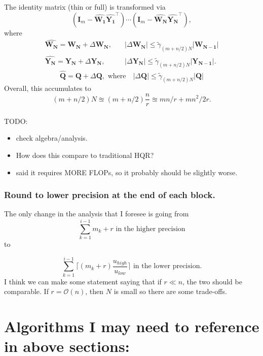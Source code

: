 \documentclass[review,onefignum,onetabnum]{siamart190516}
\newcommand{\bb}[1]{\mathbf{#1}}
\newcommand{\cO}{\mathcal{O}}
\begin{document}
The identity matrix (thin or full) is transformed via 
$$(\bb{I}_m-\hat{\bb{W_{1}}}\hat{{\bb{Y_{1}}}}^{\top})\cdots (\bb{I}_m-\hat{\bb{W_N}}\hat{{\bb{Y_N}}}^{\top}),$$
where
\begin{align*}
\hat{\bb{W_{N}}} = \bb{W_{N}}+\Delta\bb{W_{N}},\quad &  |\Delta\bb{W_{N}}| \leq \tilde{\gamma}_{(m+n/2)N}|\bb{W_{N-1}}|  \\
\hat{\bb{Y_{N}}} = \bb{Y_{N}}+\Delta\bb{Y_{N}},\quad &  |\Delta\bb{Y_{N}}| \leq \tilde{\gamma}_{(m+n/2)N}|\bb{Y_{N-1}}|.
\end{align*}
\[\boxed{ \hat{\bb{Q}} = \bb{Q}+\Delta\bb{Q},\text{ where}\quad |\Delta\bb{Q}| \leq \tilde{\gamma}_{(m+n/2)N}|\bb{Q}|} 
\]
Overall, this accumulates to $$(m+n/2)N \approxeq (m+n/2)\frac{n}{r} \approxeq mn/r + mn^2/2r.$$\\

TODO: 
\begin{itemize}
	\item check algebra/analysis.
	\item How does this compare to traditional HQR?
	\item \cite{golub2013matrix} said it requires MORE FLOPs, so it probably should be slightly worse. 
\end{itemize}

\subsubsection{Round to lower precision at the end of each block.}
The only change in the analysis that I foresee is going from 
$$ \sum_{k=1}^{i-1} m_k +r\text{ in the higher precision}$$
to 

$$ \sum_{k=1}^{i-1} \lceil (m_k +r)\frac{u_{high}}{u_{low}} \rceil\text{ in the lower precision}.$$
I think we can make some statement saying that if $r\ll n$, the two should be comparable.
If $r = \cO(n)$, then $N$ is small so there are some trade-offs. 



\section{Algorithms I may need to reference in above sections:}
\end{document}
